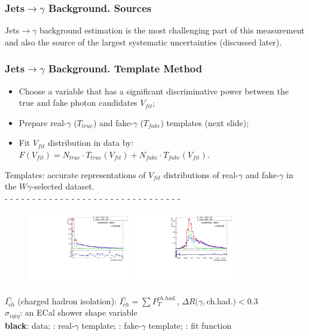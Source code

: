\begin{frame}\frametitle{Jets$\rightarrow \gamma$ Background. Sources}
  \scriptsize
  Jets$\rightarrow \gamma$ background estimation is the most challenging part of this measurement and also the source of the largest systematic uncertainties (discussed later).
\end{frame}

\begin{frame}\frametitle{Jets$\rightarrow \gamma$ Background. Template Method}
 \scriptsize
  \begin{itemize}
    \item Choose a variable that has a significant discriminative power between the true and fake photon candidates $V_{fit}$;
    \item Prepare real-$\gamma$ ($T_{true}$) and fake-$\gamma$ ($T_{fake}$) templates {\tiny{(next slide)}};
    \item Fit $V_{fit}$ distribution in data by: $F(V_{fit})=N_{true} \cdot T_{true}(V_{fit}) + N_{fake} \cdot T_{fake}(V_{fit})$.
  \end{itemize}
\tiny
Templates: accurate representations of $V_{fit}$ distributions of real-$\gamma$ and fake-$\gamma$ in the $W\gamma$-selected dataset.\\
- - - - - - - - - - - - - - - - - - - - - - - - - - - - - - - - \\
  \begin{figure}[htb]
    \begin{center}
       \includegraphics[width=0.40\textwidth]{../figs/figs_v11/MUON_WGamma/TemplateFits/c_TEMPL_CHISO_UNblind__phoEt15to20__Barrel__RooFit.pdf} \includegraphics[width=0.40\textwidth]{../figs/figs_v11/MUON_WGamma/TemplateFits/c_TEMPL_SIHIH_UNblind__phoEt15to20__Barrel__RooFit.pdf}
    \end{center}
  \end{figure}
\scriptsize
$I_{ch}^{\gamma}$ (charged hadron isolation):  $I_{ch}^{\gamma} = \sum P_T^{ch.had.}$, $\Delta R(\gamma,$ch.had.$)<$0.3\\
$\sigma_{i\eta i\eta}$: an ECal shower shape variable\\
\tiny
{\bfseries{black}}: data; {\bfseries\color{green}{green}}: real-$\gamma$ template; {\bfseries\color{blue}{blue}}: fake-$\gamma$ template; {\bfseries\color{red}{red}}: fit function
\end{frame}

